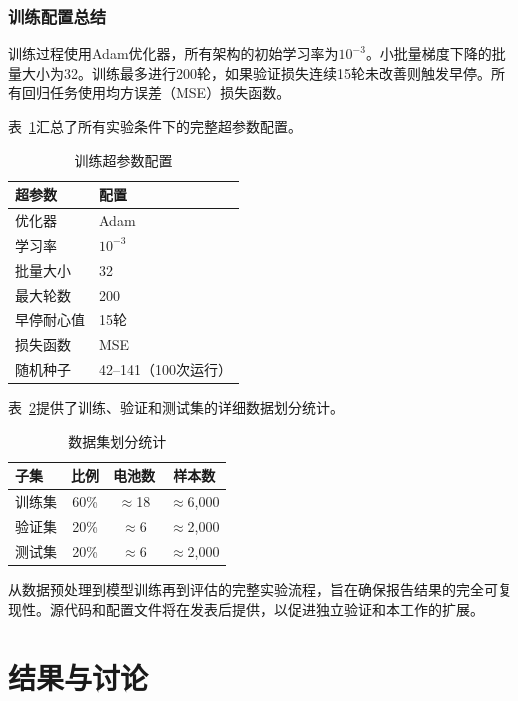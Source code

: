 \documentclass[10pt,a4paper]{ctexart}
\begin{document}
\subsubsection{训练配置总结}

训练过程使用Adam优化器，所有架构的初始学习率为$10^{-3}$。小批量梯度下降的批量大小为32。训练最多进行200轮，如果验证损失连续15轮未改善则触发早停。所有回归任务使用均方误差（MSE）损失函数。

表~\ref{tab:training_config}汇总了所有实验条件下的完整超参数配置。

\begin{table}[!htbp]
\centering
\small
\caption{训练超参数配置}
\label{tab:training_config}
\begin{tabular}{@{}ll@{}}
\toprule
\textbf{超参数} & \textbf{配置} \\
\midrule
优化器 & Adam \\
学习率 & $10^{-3}$ \\
批量大小 & 32 \\
最大轮数 & 200 \\
早停耐心值 & 15轮 \\
损失函数 & MSE \\
随机种子 & 42--141（100次运行） \\
\bottomrule
\end{tabular}
\end{table}

表~\ref{tab:data_split}提供了训练、验证和测试集的详细数据划分统计。

\begin{table}[!htbp]
\centering
\small
\caption{数据集划分统计}
\label{tab:data_split}
\begin{tabular}{@{}lccc@{}}
\toprule
\textbf{子集} & \textbf{比例} & \textbf{电池数} & \textbf{样本数} \\
\midrule
训练集 & 60\% & $\approx$18 & $\approx$6,000 \\
验证集 & 20\% & $\approx$6 & $\approx$2,000 \\
测试集 & 20\% & $\approx$6 & $\approx$2,000 \\
\bottomrule
\end{tabular}
\end{table}

从数据预处理到模型训练再到评估的完整实验流程，旨在确保报告结果的完全可复现性。源代码和配置文件将在发表后提供，以促进独立验证和本工作的扩展。

\section{结果与讨论}\label{sec:results}
\end{document}

